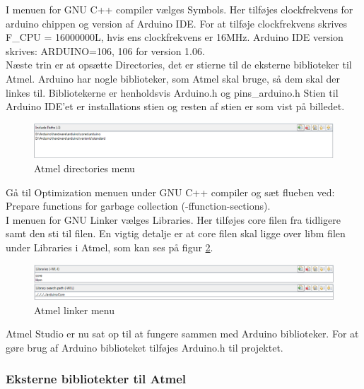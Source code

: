 I menuen for GNU C++ compiler vælges Symbols. Her tilføjes clockfrekvens for arduino chippen og version af Arduino IDE.
For at tilføje clockfrekvens skrives F\_CPU = 16000000L, hvis ens clockfrekvens er 16MHz.
Arduino IDE version skrives: ARDUINO=106, 106 for version 1.06. \\

Næste trin er at opsætte Directories, det er stierne til de eksterne biblioteker til Atmel. Arduino har nogle biblioteker, som Atmel skal bruge, så dem skal der linkes til.
Bibliotekerne er henholdsvis Arduino.h og pins\_arduino.h
Stien til Arduino IDE'et er installations stien og resten af stien er som vist på billedet.

\begin{figure}[H]
	\centering
	\includegraphics[width=1\textwidth]{Billeder/implementation/Howtoguide/atmel_directories.png}
		\caption{Atmel directories menu}
	\label{fig:atmel_directories}
\end{figure}

Gå til Optimization menuen under GNU C++ compiler og sæt flueben ved: Prepare functions for garbage collection (-ffunction-sections).\\

I menuen for GNU Linker vælges Libraries. Her tilføjes core filen fra tidligere samt den sti til filen. En vigtig detalje er at core filen skal ligge over libm filen under Libraries i Atmel, som kan ses på figur \ref{fig:atmel_libraries}.

\begin{figure}[H]
	\centering
	\includegraphics[width=1\textwidth]{Billeder/implementation/Howtoguide/atmel_linker.png}
	\caption{Atmel linker menu}
	\label{fig:atmel_libraries}
\end{figure}

Atmel Studio er nu sat op til at fungere sammen med Arduino biblioteker. For at gøre brug af Arduino biblioteket tilføjes Arduino.h til projektet.

\subsubsection*{Eksterne bibliotekter til Atmel}

